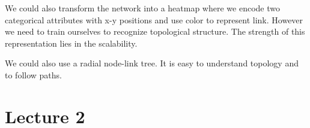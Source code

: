 \documentclass[letterpaper, 11pt]{article}
\numberwithin{equation}{section}
\numberwithin{figure}{section}
\begin{document}
We could also transform the network into a heatmap where we encode two
categorical attributes with x-y positions and use color to represent link.
However we need to train ourselves to recognize topological structure. The
strength of this representation lies in the scalability.

We could also use a radial node-link tree. It is easy to understand topology and
to follow paths.

\section{Lecture 2}
\label{sec:lec2}
\end{document}
